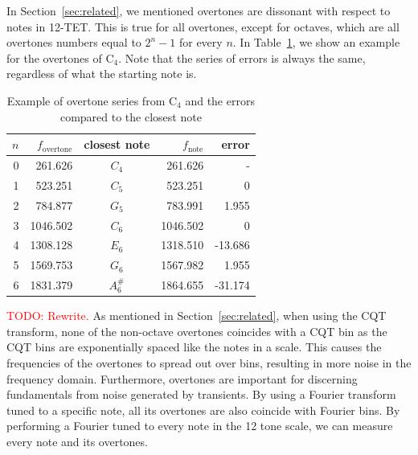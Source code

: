 \documentclass[10pt,twocolumn]{article}
\newcommand{\note}[2]{#1${}_{#2}$}
\begin{document}
In Section~\ref{sec:related}, we mentioned overtones are dissonant with respect to notes in 12-TET. This is true for all overtones, except for octaves, which are all overtones numbers equal to $2^n - 1$ for every $n$. In Table~\ref{tab:overseries}, we show an example for the overtones of \note{C}{4}. Note that the series of errors is always the same, regardless of what the starting note is. 
\begin{table}[h]
    \centering
    \begin{tabular}{rrcrr}
        $n$ & $f_{\text{overtone}}$ & closest note & $f_\text{note}$ & error \\
        \hline
        0 & 261.626  & $C_4$    & 261.626  &  - \\
        1 & 523.251  & $C_5$    & 523.251  &  0 \\
        2 & 784.877  & $G_5$    & 783.991  &  1.955 \\
        3 & 1046.502 & $C_6$    & 1046.502 &  0 \\
        4 & 1308.128 & $E_6$    & 1318.510 &  -13.686 \\
        5 & 1569.753 & $G_6$    & 1567.982 &  1.955 \\
        6 & 1831.379 & $A^\#_6$ & 1864.655 &  -31.174
    \end{tabular}
    \caption{Example of overtone series from \note{C}{4} and the errors compared to the closest note}
    \label{tab:overseries}
\end{table}

\textcolor{red}{TODO: Rewrite.}
As mentioned in Section~\ref{sec:related}, when using the CQT transform, none of the non-octave overtones coincides with a CQT bin as the CQT bins are exponentially spaced like the notes in a scale. This causes the frequencies of the overtones to spread out over bins, resulting in more noise in the frequency domain. Furthermore, overtones are important for discerning fundamentals from noise generated by transients. By using a Fourier transform tuned to a specific note, all its overtones are also coincide with Fourier bins. By performing a Fourier tuned to every note in the 12 tone scale, we can measure every note and its overtones.
\end{document}
